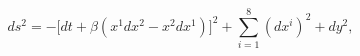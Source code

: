 \begin{equation}
\label{metgodeld5}
ds^2 = - \Big[ dt + \beta (x^1 dx^2 - x^2 dx^1) \Big]^2  
+ \sum_{i=1}^8 ( dx^i )^2  + dy^2,
\end{equation}

